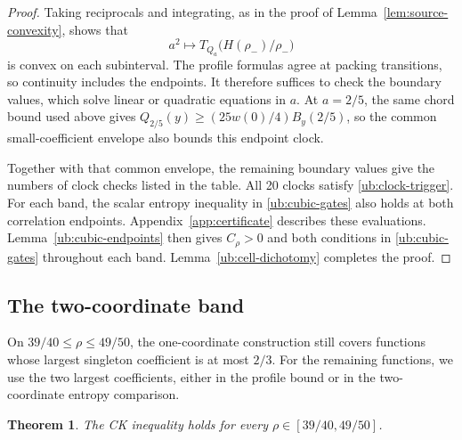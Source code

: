 \documentclass[11pt,letterpaper]{amsart}
\newcommand{\1}{\mathbf 1}
\newtheorem{theorem}{Theorem}[section]
\numberwithin{equation}{section}
\begin{document}
\begin{proof}
Taking reciprocals and integrating, as in the proof of
Lemma~\ref{lem:source-convexity}, shows that
\[
 a^2\longmapsto
 T_{Q_a}\bigl(H(\rho_-)/\rho_-\bigr)
\]
is convex on each subinterval.
The profile formulas agree at packing transitions, so continuity
includes the endpoints.
It therefore suffices to check the boundary values, which solve
linear or quadratic equations in $a$.
At $a=2/5$, the same chord bound used above gives
$Q_{2/5}(y)\ge(25w(0)/4)B_y(2/5)$,
so the common small-coefficient envelope also bounds this
endpoint clock.

Together with that common envelope, the remaining boundary
values give the numbers of clock checks listed in the table.
All 20 clocks satisfy \eqref{ub:clock-trigger}.
For each band, the scalar entropy inequality in
\eqref{ub:cubic-gates} also holds at both correlation endpoints.
Appendix~\ref{app:certificate} describes these evaluations.
Lemma~\ref{ub:cubic-endpoints} then gives $C_\rho>0$ and both
conditions in \eqref{ub:cubic-gates} throughout each band.
Lemma~\ref{ub:cell-dichotomy} completes the proof.
\end{proof}

\subsection{The two-coordinate band}

On $39/40\le\rho\le49/50$, the one-coordinate construction
still covers functions whose largest singleton coefficient is
at most $2/3$. For the remaining functions, we use the two largest
coefficients, either in the profile bound or in the
two-coordinate entropy comparison.

\begin{theorem}\label{ub:last-middle}
The CK inequality holds for every $\rho\in[39/40,49/50]$.
\end{theorem}
\end{document}
